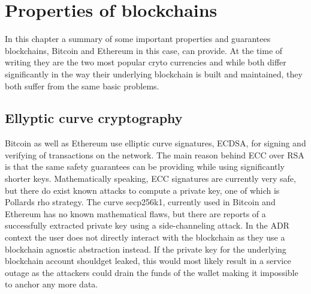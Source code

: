 \documentclass[12pt,msc,a4paper,oneside]{ucl_thesis}
\begin{document}
\chapter{Properties of blockchains}
\label{chapter:properties_of_blockchains}
In this chapter a summary of some important properties and guarantees blockchains, Bitcoin and Ethereum in this case, can provide. At the time of writing they are the two most popular cryto currencies and while both differ significantly in the way their underlying blockchain is built and maintained, they both suffer from the same basic problems. 

\section{Ellyptic curve cryptography}
Bitcoin as well as Ethereum use elliptic curve signatures, ECDSA, for signing and verifying of transactions on the network. The main reason behind ECC over RSA is that the same safety guarantees can be providing while using significantly shorter keys. Mathematically speaking, ECC signatures are currently very safe, but there do exist known attacks to compute a private key, one of which is Pollards rho strategy. The curve secp256k1, currently used in Bitcoin and Ethereum has no known mathematical flaws, but there are reports of a successfully extracted private key using a side-channeling attack. \cite{EllipticCurveOverview} 
In the ADR context the user does not directly interact with the blockchain as they use a blockchain agnostic abstraction instead. If the private key for the underlying blockchain account shouldget leaked, this would most likely result in a service outage as the attackers could drain the funds of the wallet making it impossible to anchor any more data.
\end{document}
